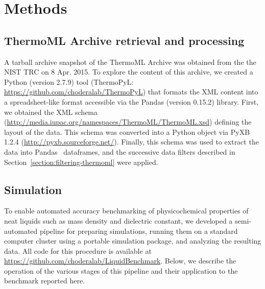\documentclass[aps,pre,twocolumn,nofootinbib,superscriptaddress,linenumbers]{revtex4-1}
\begin{document}

\section{Methods}
\label{section:methods}

\subsection{ThermoML Archive retrieval and processing}
\label{section:thermoml-archive-retrieval}


A tarball archive snapshot of the ThermoML Archive was obtained from the the NIST TRC on 8 Apr. 2015.
To explore the content of this archive, we created a Python (version 2.7.9) tool (ThermoPyL: \url{https://github.com/choderalab/ThermoPyL}) that formats the XML content into a spreadsheet-like format accessible via the Pandas (version 0.15.2) library.  
First, we obtained the XML schema (\url{http://media.iupac.org/namespaces/ThermoML/ThermoML.xsd}) defining the layout of the data.
This schema was converted into a Python object via PyXB 1.2.4 (\url{http://pyxb.sourceforge.net/}).
Finally, this schema was used to extract the data into Pandas~\cite{pandas} dataframes, and the successive data filters described in Section~\ref{section:filtering-thermoml} were applied.  

\subsection{Simulation}
\label{section:simulation}

To enable automated accuracy benchmarking of physicochemical properties of neat liquids such as mass density and dielectric constant, we developed a semi-automated pipeline for preparing simulations, running them on a standard computer cluster using a portable simulation package, and analyzing the resulting data.
All code for this procedure is available at  \url{https://github.com/choderalab/LiquidBenchmark}.
Below, we describe the operation of the various stages of this pipeline and their application to the benchmark reported here.
\end{document}
